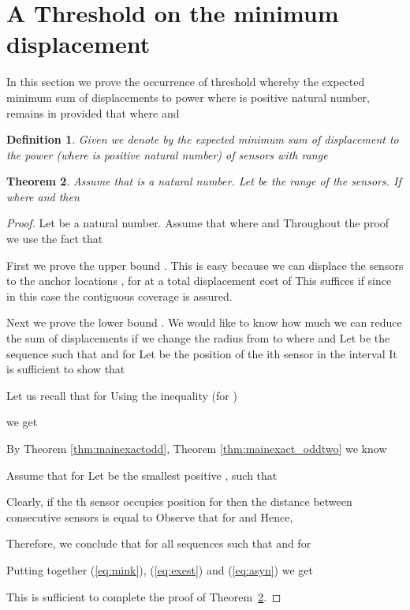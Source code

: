 \documentclass[final,5p,times,twocolumn]{elsarticle_mod}
\newtheorem{theorem}{Theorem}
\newtheorem{Definition}[theorem]{Definition}
\begin{document}
\section{A Threshold on the minimum displacement}
\label{Minimum displacement:sec}
In this section
we prove the occurrence of threshold
whereby the expected minimum sum of
displacements to power  where  is positive natural number, remains in 
provided that  where  and 
\begin{Definition}
Given  we denote by  the expected minimum sum of displacement to the power  (where  is positive natural number) of  sensors
with range 
\end{Definition}
\begin{theorem}
\label{cov1:thm}
Assume that  is a natural number. Let  be the range of the sensors.
If    where  and  then

\end{theorem}
\begin{proof} Let  be a natural number.
Assume that  where  and 
Throughout the proof we use the fact that


First we prove the upper bound
. This is easy because we can
displace the sensors to the anchor locations ,
for  at a total displacement cost of
 This suffices if 
since in this case the contiguous coverage is assured.

Next we prove the lower bound
.
We would like to know how much we can reduce
the sum of displacements if we change the radius
from 
to  where  and 
Let  be the sequence such that 
  and  for 
Let  be the position of the ith sensor in the interval 
It is sufficient to show that

Let us recall that  for  Using the inequality
(for )

we get

By Theorem \ref{thm:mainexactodd}, Theorem \ref{thm:mainexact_oddtwo}
we know 

Assume that 
for  Let  be the smallest positive , such that 

Clearly, if the th sensor occupies position  for  then the distance between consecutive sensors is equal to 
Observe that  for  and
 Hence,

Therefore, we conclude that for all sequences  such that 
  and  for 

Putting together (\ref{eq:mink}), (\ref{eq:exest}) and (\ref{eq:asyn}) we get

This is sufficient to complete the proof of Theorem~\ref{cov1:thm}.
\end{proof}
\end{document}
